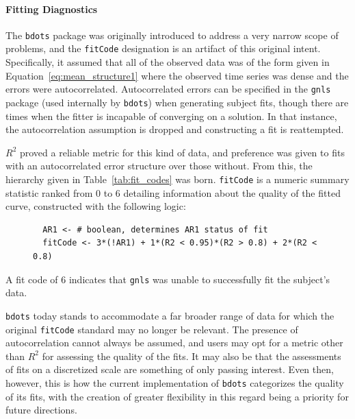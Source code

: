 \documentclass{article}
\newcommand{\xt}{\texttt}%
\begin{document}
\paragraph{Fitting Diagnostics}\label{sec:fitcode}

The \xt{bdots} package was originally introduced to address a very narrow scope of problems, and the \xt{fitCode} designation is an artifact of this original intent. Specifically, it assumed that all of the observed data was of the form given in Equation~\ref{eq:mean_structure1} where the observed time series was dense and the errors were autocorrelated. Autocorrelated errors can be specified in the \xt{gnls} package (used internally by \xt{bdots}) when generating subject fits, though there are times when the fitter is incapable of converging on a solution. In that instance, the autocorrelation assumption is dropped and constructing a fit is reattempted.

$R^2$ proved a reliable metric for this kind of data, and preference was given to fits with an autocorrelated error structure over those without. From this, the hierarchy given in Table~\ref{tab:fit_codes} was born. \xt{fitCode} is a numeric summary statistic ranked from 0 to 6 detailing information about the quality of the fitted curve, constructed with the following logic:

\begin{singlespace}
\begin{figure}[H]
\centering
\begin{BVerbatim}
  AR1 <- # boolean, determines AR1 status of fit
  fitCode <- 3*(!AR1) + 1*(R2 < 0.95)*(R2 > 0.8) + 2*(R2 < 0.8)
\end{BVerbatim}
\end{figure}
\end{singlespace}
A fit code of 6 indicates that \xt{gnls} was unable to successfully fit the subject's data. 

\xt{bdots} today stands to accommodate a far broader range of data for which the original \xt{fitCode} standard may no longer be relevant. The presence of autocorrelation cannot always be assumed, and users may opt for a metric other than $R^2$ for assessing the quality of the fits. It may also be that the assessments of fits on a discretized scale are something of only passing interest. Even then, however, this is how the current implementation of \xt{bdots} categorizes the quality of its fits, with the creation of greater flexibility in this regard being a priority for future directions. 
\end{document}
